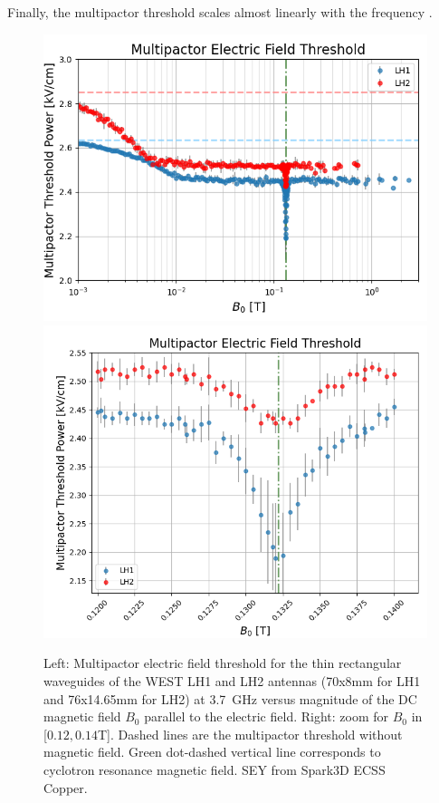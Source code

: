 Finally, the multipactor threshold scales almost linearly with the frequency .


\begin{figure}[h]
	\centering
	\includegraphics[width=0.48\linewidth]{figures/chap4/Eth_vs_By_C3-C4}
	\includegraphics[width=0.48\linewidth]{figures/chap4/Eth_vs_By_C3-C4_zoom}
	\caption{Left: Multipactor electric field threshold for the thin rectangular waveguides of the WEST LH1 and LH2 antennas (70x8mm for LH1 and 76x14.65mm for LH2) at 3.7~GHz versus magnitude of the DC magnetic field $B_0$ parallel to the electric field. Right: zoom for $B_0$ in [$0.12,0.14$T]. Dashed lines are the multipactor threshold without magnetic field. Green dot-dashed vertical line corresponds to cyclotron resonance magnetic field. SEY from Spark3D ECSS Copper.}
	\label{fig:ethvsbyc3-c4}
\end{figure}


